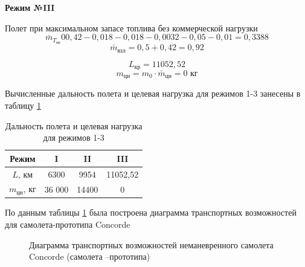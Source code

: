 \textbf{Режим №III}

Полет при максимальном запасе топлива без коммерческой нагрузки 
$$\bar{m}_{T_\text{кр}} 0 0,42 - 0,018 - 0,018 - 0,0032 - 0,05 - 0,01 = 0,3388$$
$$\bar{m}_\text{взл} = 0,5 + 0,42 = 0,92$$

$$L_\text{кр} = 11052,52$$
$$m_\text{цн} = m_0 \cdot \bar{m}_\text{цн} = 0 \text{ кг}$$

Вычисленные дальность полета и целевая нагрузка для режимов 1-3 занесены в
таблицу \ref{tab:Дальность полета и целевая нагрузка для режимов 1-3} 

\begin{table}[H]
    \centering
    \caption{Дальность полета и целевая нагрузка для режимов 1-3}
    \begin{tabular}{|c|c|c|c|}
    \hline
        Режим & I & II & III  \\ \hline
        $L$, км & 6300 & 9954 & 11052,52 \\ \hline
        $m_\text{цн}$, кг & 36 000 & 14400 &0 \\ \hline
    \end{tabular}
    \label{tab:Дальность полета и целевая нагрузка для режимов 1-3}
\end{table}

По данным таблицы \ref{tab:Дальность полета и целевая нагрузка для режимов 1-3}  была построена диаграмма транспортных возможностей для самолета-прототипа Concorde

\begin{figure}[H]
    \caption{Диаграмма транспортных возможностей неманевренного самолета Concorde (самолета –прототипа)}
    \label{fig:Диаграмма транспортных возможностей неманевренного самолета Concorde (самолета –прототипа)}
\end{figure}

